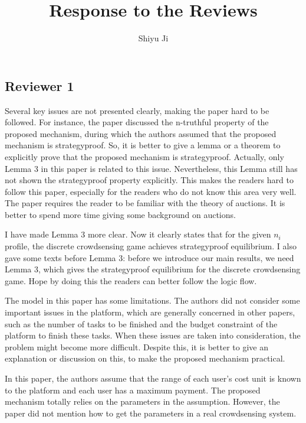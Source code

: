 \documentclass[a4paper,11pt]{exam}
\begin{document}
\title{Response to the Reviews}
\author{Shiyu Ji}
\maketitle

\begin{questions}
\section{Reviewer 1}
\question Several key issues are not presented clearly, making the paper hard to be followed. For instance, the paper discussed the n-truthful property of the proposed mechanism, during which the authors assumed that the proposed mechanism is strategyproof. So, it is better to give a lemma or a theorem to explicitly prove that the proposed mechanism is strategyproof. Actually, only Lemma 3 in this paper is related to this issue. Nevertheless, this Lemma still has not shown the strategyproof property explicitly. This makes the readers hard to follow this paper, especially for the readers who do not know this area very well. The paper requires the reader to be familiar with the theory of auctions. It is better to spend more time giving some background on auctions. 
\begin{solution}
I have made Lemma 3 more clear. Now it clearly states that for the given $n_i$ profile, the discrete crowdsensing game achieves strategyproof equilibrium. I also gave some texts before Lemma 3: before we introduce our main results, we need Lemma 3, which gives the strategyproof equilibrium for the discrete crowdsensing game. Hope by doing this the readers can better follow the logic flow. 
\end{solution}

\question The model in this paper has some limitations. The authors did not consider some important issues in the platform, which are generally concerned in other papers, such as the number of tasks to be finished and the budget constraint of the platform to finish these tasks. When these issues are taken into consideration, the problem might become more difficult. Despite this, it is better to give an explanation or discussion on this, to make the proposed mechanism practical. 


\question In this paper, the authors assume that the range of each user’s cost unit is known to the platform and each user has a maximum payment. The proposed mechanism totally relies on the parameters in the assumption. However, the paper did not mention how to get the parameters in a real crowdsensing system.


\end{questions}
\end{document}
